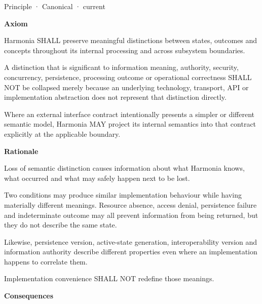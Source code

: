 \label{element:d3fc6025dc7646d1b2020b51f7a44bfa}
{\small Principle · Canonical · current}\par

\par\medskip\textbf{Axiom}\par


Harmonia SHALL preserve meaningful distinctions between states, outcomes and concepts throughout its internal processing and across subsystem boundaries.



A distinction that is significant to information meaning, authority, security, concurrency, persistence, processing outcome or operational correctness SHALL NOT be collapsed merely because an underlying technology, transport, API or implementation abstraction does not represent that distinction directly.



Where an external interface contract intentionally presents a simpler or different semantic model, Harmonia MAY project its internal semantics into that contract explicitly at the applicable boundary.



\par\medskip\textbf{Rationale}\par


Loss of semantic distinction causes information about what Harmonia knows, what occurred and what may safely happen next to be lost.



Two conditions may produce similar implementation behaviour while having materially different meanings. Resource absence, access denial, persistence failure and indeterminate outcome may all prevent information from being returned, but they do not describe the same state.



Likewise, persistence version, active-state generation, interoperability version and information authority describe different properties even where an implementation happens to correlate them.



Implementation convenience SHALL NOT redefine those meanings.



\par\medskip\textbf{Consequences}\par


